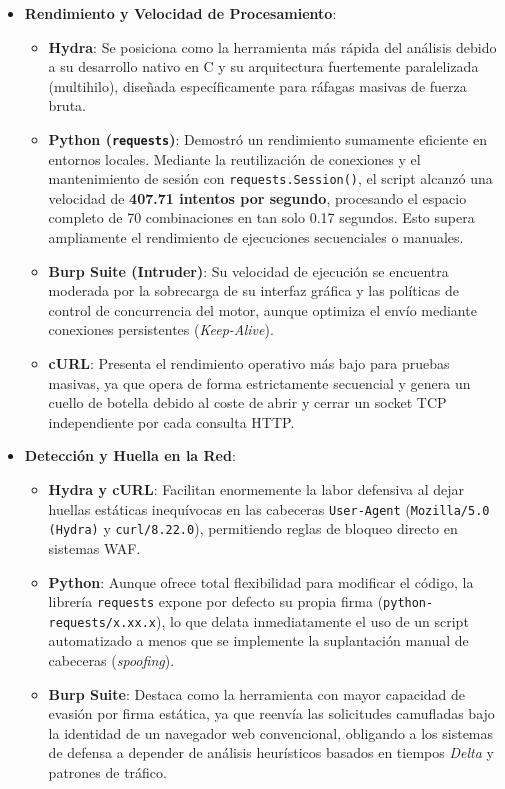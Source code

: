 \documentclass[letter,12pt]{article}
\begin{document}
\begin{itemize}
    \item \textbf{Rendimiento y Velocidad de Procesamiento}:
    \begin{itemize}
        \item \textbf{Hydra}: Se posiciona como la herramienta más rápida del análisis debido a su desarrollo nativo en C y su arquitectura fuertemente paralelizada (multihilo), diseñada específicamente para ráfagas masivas de fuerza bruta.
        \item \textbf{Python (\texttt{requests})}: Demostró un rendimiento sumamente eficiente en entornos locales. Mediante la reutilización de conexiones y el mantenimiento de sesión con \texttt{requests.Session()}, el script alcanzó una velocidad de \textbf{407.71 intentos por segundo}, procesando el espacio completo de 70 combinaciones en tan solo 0.17 segundos. Esto supera ampliamente el rendimiento de ejecuciones secuenciales o manuales.
        \item \textbf{Burp Suite (Intruder)}: Su velocidad de ejecución se encuentra moderada por la sobrecarga de su interfaz gráfica y las políticas de control de concurrencia del motor, aunque optimiza el envío mediante conexiones persistentes (\textit{Keep-Alive}).
        \item \textbf{cURL}: Presenta el rendimiento operativo más bajo para pruebas masivas, ya que opera de forma estrictamente secuencial y genera un cuello de botella debido al coste de abrir y cerrar un socket TCP independiente por cada consulta HTTP.
    \end{itemize}
    
    \item \textbf{Detección y Huella en la Red}:
    \begin{itemize}
        \item \textbf{Hydra y cURL}: Facilitan enormemente la labor defensiva al dejar huellas estáticas inequívocas en las cabeceras \texttt{User-Agent} (\texttt{Mozilla/5.0 (Hydra)} y \texttt{curl/8.22.0}), permitiendo reglas de bloqueo directo en sistemas WAF.
        \item \textbf{Python}: Aunque ofrece total flexibilidad para modificar el código, la librería \texttt{requests} expone por defecto su propia firma (\texttt{python-requests/x.xx.x}), lo que delata inmediatamente el uso de un script automatizado a menos que se implemente la suplantación manual de cabeceras (\textit{spoofing}).
        \item \textbf{Burp Suite}: Destaca como la herramienta con mayor capacidad de evasión por firma estática, ya que reenvía las solicitudes camufladas bajo la identidad de un navegador web convencional, obligando a los sistemas de defensa a depender de análisis heurísticos basados en tiempos \textit{Delta} y patrones de tráfico.
    \end{itemize}
\end{itemize}
\end{document}
